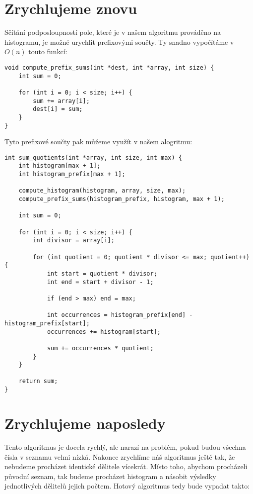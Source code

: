 \documentclass{article}
\begin{document}
\section{Zrychlujeme znovu}

Sčítání podposloupností pole, které je v našem algoritmu prováděno na histogramu, je možné urychlit prefixovými součty. Ty snadno vypočítáme v \(O\left(n\right)\) touto funkcí:

\begin{verbatim}
void compute_prefix_sums(int *dest, int *array, int size) {
    int sum = 0;

    for (int i = 0; i < size; i++) {
        sum += array[i];
        dest[i] = sum;
    }
}
\end{verbatim}

Tyto prefixové součty pak můžeme využít v našem alogritmu:

\begin{verbatim}
int sum_quotients(int *array, int size, int max) {
    int histogram[max + 1];
    int histogram_prefix[max + 1];

    compute_histogram(histogram, array, size, max);
    compute_prefix_sums(histogram_prefix, histogram, max + 1);
    
    int sum = 0;

    for (int i = 0; i < size; i++) {
        int divisor = array[i];

        for (int quotient = 0; quotient * divisor <= max; quotient++) {
            int start = quotient * divisor;
            int end = start + divisor - 1;

            if (end > max) end = max;

            int occurrences = histogram_prefix[end] - histogram_prefix[start];
            occurrences += histogram[start];

            sum += occurrences * quotient;
        }
    }

    return sum;
}
\end{verbatim}

\section{Zrychlujeme naposledy}

Tento algoritmus je docela rychlý, ale narazí na problém, pokud budou všechna čísla v seznamu velmi nízká. Nakonec zrychlíme náš algoritmus ještě tak, že nebudeme procházet identické dělitele vícekrát. Místo toho, abychom procházeli původní seznam, tak budeme procházet histogram a násobit výsledky jednotlivých dělitelů jejich počtem. Hotový algoritmus tedy bude vypadat takto:
\end{document}

